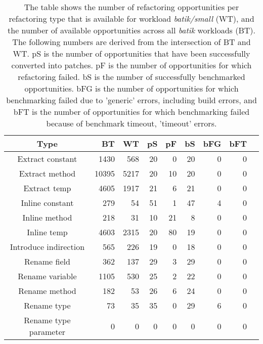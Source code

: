 \begin{table}[!h]
\caption{The table shows the number of refactoring opportunities per refactoring type that is available for workload \textit{batik/small} (WT), and the number of available opportunities across all \textit{batik} workloads (BT). The following numbers are derived from the intersection of BT and WT. pS is the number of opportunities that have been successfully converted into patches. pF is the number of opportunities for which refactoring failed. bS is the number of successfully benchmarked opportunities. bFG is the number of opportunities for which benchmarking failed due to 'generic' errors, including build errors, and bFT is the number of opportunities for which benchmarking failed because of benchmark timeout, 'timeout' errors.}
\begin{tabular}{c|*{7}{r}r}
Type&BT&WT&pS&pF&bS&bFG&bFT\\
\hline
Extract constant&1430&568&20&0&20&0&0\\
Extract method&10395&5217&20&10&20&0&0\\
Extract temp&4605&1917&21&6&21&0&0\\
Inline constant&279&54&51&1&47&4&0\\
Inline method&218&31&10&21&8&0&0\\
Inline temp&4603&2315&20&80&19&0&0\\
Introduce indirection&565&226&19&0&18&0&0\\
Rename field&362&137&29&3&29&0&0\\
Rename variable&1105&530&25&2&22&0&0\\
Rename method&182&53&26&6&24&0&0\\
Rename type&73&35&35&0&29&6&0\\
Rename type parameter&0&0&0&0&0&0&0\\
\end{tabular}
\end{table}
